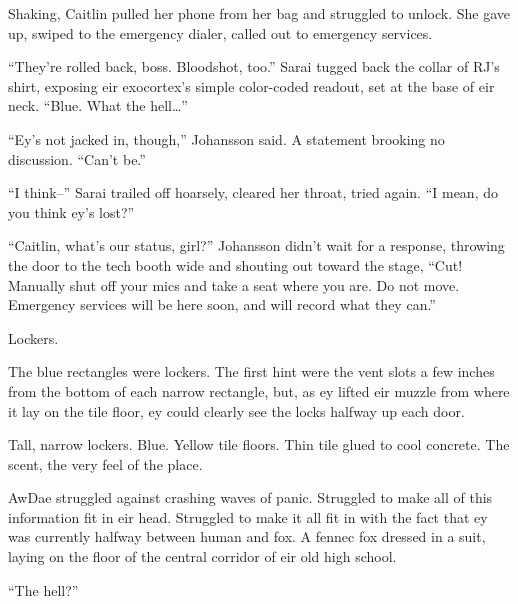 Shaking, Caitlin pulled her phone from her bag and struggled to unlock. She gave up, swiped to the emergency dialer, called out to emergency services.

``They're rolled back, boss. Bloodshot, too.'' Sarai tugged back the collar of RJ's shirt, exposing eir exocortex's simple color-coded readout, set at the base of eir neck. ``Blue. What the hell\ldots{}''

``Ey's not jacked in, though,'' Johansson said. A statement brooking no discussion. ``Can't be.''

``I think--'' Sarai trailed off hoarsely, cleared her throat, tried again. ``I mean, do you think ey's lost?''

``Caitlin, what's our status, girl?'' Johansson didn't wait for a response, throwing the door to the tech booth wide and shouting out toward the stage, ``Cut! Manually shut off your mics and take a seat where you are. Do not move. Emergency services will be here soon, and will record what they can.''

Lockers.

The blue rectangles were lockers. The first hint were the vent slots a few inches from the bottom of each narrow rectangle, but, as ey lifted eir muzzle from where it lay on the tile floor, ey could clearly see the locks halfway up each door.

Tall, narrow lockers. Blue. Yellow tile floors. Thin tile glued to cool concrete. The scent, the very feel of the place.

AwDae struggled against crashing waves of panic. Struggled to make all of this information fit in eir head. Struggled to make it all fit in with the fact that ey was currently halfway between human and fox. A fennec fox dressed in a suit, laying on the floor of the central corridor of eir old high school.

``The hell?''
